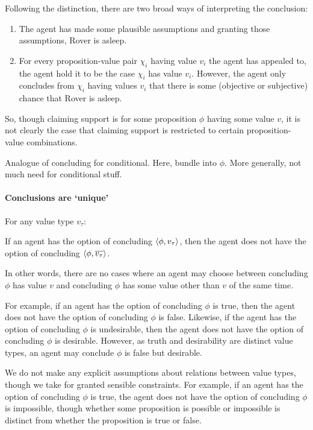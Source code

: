 \begin{note}[Suppositions]
  Following the distinction, there are two broad ways of interpreting the conclusion:
  \begin{enumerate}
  \item
    The agent has made some plausible assumptions and granting those assumptions, Rover is asleep.
  \item
    For every proposition-value pair \(\chi_{i}\) having value \(v_{i}\) the agent has appealed to, the agent hold it to be the case \(\chi_{i}\) has value \(v_{i}\).
    However, the agent only concludes from \(\chi_{i}\) having values \(v_{i}\) that there is some (objective or subjective) chance that Rover is asleep.
  \end{enumerate}
  So, though claiming support is for some proposition \(\phi\) having some value \(v\), it is not clearly the case that claiming support is restricted to certain proposition-value combinations.
\end{note}

\begin{note}[Analogue]
  Analogue of concluding for conditional.
  Here, bundle into \(\phi\).
  More generally, not much need for conditional stuff.
\end{note}

\paragraph*{Conclusions are `unique'}

\begin{note}
  \begin{assumption}
    \label{assu:conc:unique}
    For any value type \(v_{\tau}\):

    If an agent has the option of concluding \(\langle \phi, v_{\tau} \rangle\), then the agent does not have the option of concluding \(\langle \phi, \overline{v_{\tau}} \rangle\).
  \end{assumption}

  In other words, there are no cases where an agent may choose between concluding \(\phi\) has value \(v\) and concluding \(\phi\) has some value other than \(v\) of the same time.

  For example, if an agent has the option of concluding \(\phi\) is true, then the agent does not have the option of concluding \(\phi\) is false.
  Likewise, if the agent has the option of concluding \(\phi\) is undesirable, then the agent does not have the option of concluding \(\phi\) is desirable.
  However, as truth and desirability are distinct value types, an agent may conclude \(\phi\) is false but desirable.

  We do not make any explicit assumptions about relations between value types, though we take for granted sensible constraints.
  For example, if an agent has the option of concluding \(\phi\) is true, the agent does not have the option of concluding \(\phi\) is impossible, though whether some proposition is possible or impossible is distinct from whether the proposition is true or false.
\end{note}

